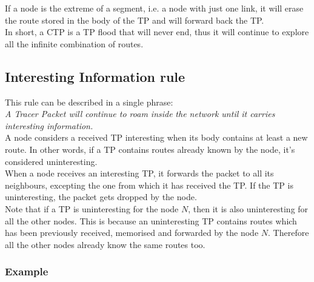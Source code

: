\documentclass[a4paper]{article}
\newcommand{\qq}{\qquad}
\begin{document}
If a node is the extreme of a segment, i.e. a node with just one link, it will
erase the route stored in the body of the TP and will forward back the TP.\\

In short, a CTP is a TP flood that will never end, thus it will continue to
explore all the infinite combination of routes.

\subsection{Interesting Information rule}
\label{intinforule}
This rule can be described in a single phrase:\\

\emph{A Tracer Packet will continue to roam inside}
\emph{the network until it carries interesting information.}
\qq\\

A node considers a received TP interesting when its body contains at least a
new route. In other words, if a TP contains routes already known by the node,
it's considered uninteresting.\\

When a node receives an interesting TP, it forwards the packet to all its
neighbours, excepting the one from which it has received the TP.
If the TP is uninteresting, the packet gets dropped by the node.\\

Note that if a TP is uninteresting for the node $N$, then it is also
uninteresting for all the other nodes. This is because an uninteresting TP
contains routes which has been previously received, memorised and forwarded
by the node $N$. Therefore all the other nodes already know the same
routes too.

\subsubsection*{Example}
\label{sec:cycle_qv2_example}
\end{document}
